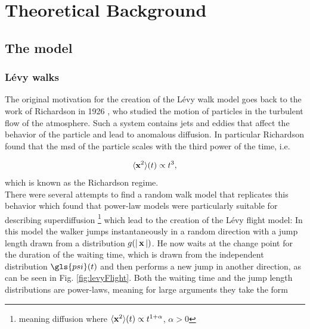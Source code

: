 \chapter{Theoretical Background}

\section{The model}

\subsection{L\'evy walks}

The original motivation for the creation of the L\'evy walk model goes back to the work of Richardson in 1926 \cite{richardson}, who studied the motion of particles in the turbulent flow of the atmosphere. Such a system contains jets and eddies that affect the behavior of the particle and lead to anomalous diffusion. In particular Richardson found that the \gls{msd} of the particle scales with the third power of the time, i.e.

\begin{align}
\langle \mathbf{ x }^2 \rangle(t) \propto t^3 ,
\end{align}
%
which is known as the Richardson regime.\\

There were several attempts to find a random walk model that replicates this behavior which found that power-law models were particularly suitable for describing superdiffusion \footnote{meaning diffusion where $\langle \mathbf{ x }^2 \rangle(t) \propto t^{1+\alpha}$, $\alpha>0$} which lead to the creation of the L\'evy flight model: In this model the walker jumps instantaneously in a random direction with a jump length drawn from a distribution $g(\left|\,\mathbf{ x }\,\right|)$. He now waits at the change point for the duration of the waiting time, which is drawn from the independent distribution $\gls{psi}(t)$ and then performs a new jump in another direction, as can be seen in Fig. \ref{fig:levyFlight}. Both the waiting time and the jump length distributions are power-laws, meaning for large arguments they take the form 


